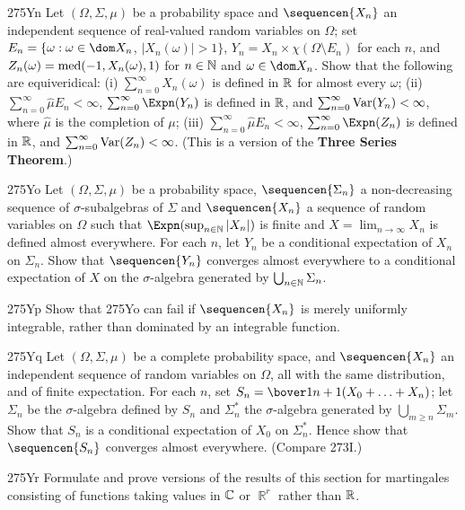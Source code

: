 {\spheader 275Yn Let $(\Omega,\Sigma,\mu)$ be a probability space and
$\sequencen{X_n}$ an independent sequence of
real-valued random variables on $\Omega$;  set
$E_n=\{\omega:\omega\in\dom X_n$, $|X_n(\omega)|>1\}$,
$Y_n=X_n\times\chi(\Omega\setminus E_n)$ for each $n$, and
$Z_n(\omega)=\mathop{\text{med}}(-1,X_n(\omega),1)$ for $n\in\Bbb N$ and
$\omega\in\dom X_n$.   Show that the following are equiveridical:
(i) $\sum_{n=0}^{\infty}X_n(\omega)$ is defined in $\Bbb R$ for almost
every $\omega$;  (ii) $\sum_{n=0}^{\infty}\hat\mu E_n<\infty$,
$\sum_{n=0}^{\infty}\Expn(Y_n)$ is defined in $\Bbb R$, and
$\sum_{n=0}^{\infty}\mathop{\text{Var}}(Y_n)<\infty$, where $\hat\mu$ is the completion of
$\mu$;
(iii) $\sum_{n=0}^{\infty}\hat\mu E_n<\infty$,
$\sum_{n=0}^{\infty}\Expn(Z_n)$ is defined in $\Bbb R$, and
$\sum_{n=0}^{\infty}\mathop{\text{Var}}(Z_n)<\infty$.   
(This is a version of the {\bf Three Series Theorem}.)

\spheader 275Yo Let $(\Omega,\Sigma,\mu)$ be a probability
space, $\sequencen{\Sigma_n}$ a non-decreasing sequence of
$\sigma$-subalgebras of $\Sigma$ and $\sequencen{X_n}$ a sequence of
random variables on $\Omega$ such that
$\Expn(\sup_{n\in\Bbb N}|X_n|)$ is finite
and $X=\lim_{n\to\infty}X_n$ is defined almost everywhere.
For each $n$, let $Y_n$ be a conditional expectation of $X_n$ on
$\Sigma_n$.   Show that $\sequencen{Y_n}$ converges almost everywhere to
a conditional expectation of $X$ on the $\sigma$-algebra generated by
$\bigcup_{n\in\Bbb N}\Sigma_n$.

\spheader 275Yp Show that 275Yo can fail if $\sequencen{X_n}$ is
merely uniformly integrable, rather than dominated by an integrable
function.

\spheader 275Yq Let $(\Omega,\Sigma,\mu)$ be a complete probability
space, and $\sequencen{X_n}$ an independent sequence of random variables
on $\Omega$, all with the same distribution, and of finite expectation.
For each $n$, set $S_n=\bover1{n+1}(X_0+\ldots+X_n)$;  let $\Sigma_n$ be
the $\sigma$-algebra defined by $S_n$ and $\Sigma_n^*$ the
$\sigma$-algebra generated by $\bigcup_{m\ge n}\Sigma_m$.   Show that
$S_n$ is a conditional expectation of $X_0$ on $\Sigma_n^*$.
   Hence show that $\sequencen{S_n}$ converges almost
everywhere.   (Compare 273I.)

\spheader 275Yr Formulate and prove versions of the
results of this section for martingales consisting of functions taking
values in $\Bbb C$ or $\BbbR^r$ rather than $\Bbb R$.
}%

